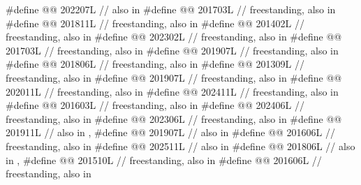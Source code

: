 \begin{codeblock}
#define @@                     202207L // also in 
#define @@                      201703L // freestanding, also in 
#define @@             201811L // freestanding, also in 
#define @@                          201402L // freestanding, also in 
#define @@              202302L // freestanding, also in 
#define @@                      201703L // freestanding, also in 
#define @@              201907L // freestanding, also in 
#define @@            201806L // freestanding, also in 
#define @@                   201309L // freestanding, also in 
#define @@       201907L // freestanding, also in 
#define @@                    202011L // freestanding, also in 
#define @@           202411L // freestanding, also in 
#define @@                      201603L // freestanding, also in 
#define @@                202406L // freestanding, also in 
#define @@                202306L // freestanding, also in 
#define @@                           201911L // also in , 
#define @@                             201907L // also in 
#define @@                           201606L // freestanding, also in 
#define @@                            202511L // also in 
#define @@           201806L // also in , 
#define @@                    201510L // freestanding, also in 
#define @@                   201606L // freestanding, also in 

\end{codeblock}
